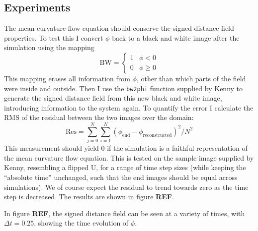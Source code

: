 \documentclass[sigconf]{acmart}
\begin{document}
\subsection{Experiments}
The mean curvature flow equation should conserve the signed distance field properties. To test this I convert $ \phi $ back to a black and white image after the simulation using the mapping
\begin{equation}\label{key}
	\text{BW} = \begin{cases}
	1 & \phi < 0 \\
	0 & \phi \geq 0
	\end{cases}
\end{equation}
This mapping erases all information from $ \phi $, other than which parts of the field were inside and outside. Then I use the \texttt{bw2phi} function supplied by Kenny to generate the signed distance field from this new black and white image, introducing information to the system again. To quantify the error I calculate the RMS of the residual between the two images over the domain:
\begin{equation}\label{key}
	\text{Res} = \sum_{j=0}^N \sum_{i=1}^{N} (\phi_{\text{end}} - \phi_{\text{reconstructed}})^2 / N^2
\end{equation} 
This measurement should yield 0 if the simulation is a faithful representation of the mean curvature flow equation. This is tested on the sample image supplied by Kenny, resembling a flipped U, for a range of time step sizes (while keeping the ``absolute time'' unchanged, such that the end images should be equal across simulations). We of course expect the residual to trend towards zero as the time step is decreased. The results are shown in figure \textbf{REF}.

In figure \textbf{REF}, the signed distance field can be seen at a variety of times, with $ \Delta t=0.25 $, showing the time evolution of $ \phi $.
\end{document}
